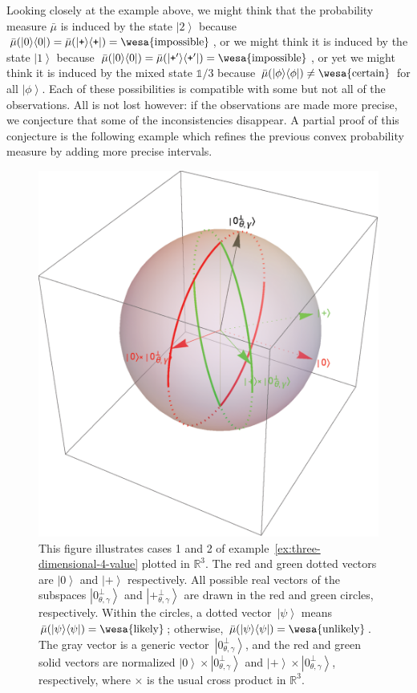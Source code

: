 \documentclass[12pt]{iopart}
\theoremstyle{remark}
\newcommand{\imposs}{{\mbox{\wesa{impossible}}}}
\newcommand{\likely}{{\mbox{\wesa{likely}}}}
\newcommand{\unlikely}{{\mbox{\wesa{unlikely}}}}
\newcommand{\necess}{{\mbox{\wesa{certain}}}}
\newcommand{\ket}[1]{{\left\vert{#1}\right\rangle}}
\newcommand{\op}[2]{\ensuremath{\left\vert{#1}\middle\rangle\middle\langle{#2}\right\vert}}
\newcommand{\proj}[1]{\op{#1}{#1}}
\newcommand{\ps}{\texttt{+}}
\begin{document}
Looking closely at the example above, we might think that the probability
measure $\bar{\mu}$ is induced by the state $\ket{2}$ because $\bar{\mu}(\proj{0})=\bar{\mu}(\proj{\ps})=\imposs$,
or we might think it is induced by the state $\ket{1}$ because $\bar{\mu}(\proj{0})=\bar{\mu}(\proj{\ps'})=\imposs$,
or yet we might think it is induced by the mixed state $\mathbb{1}/3$
because $\bar{\mu}(\proj{\phi})\ne\necess$ for all $\ket{\phi}$.
Each of these possibilities is compatible with some but not all of
the observations. All is not lost however: if the observations are
made more precise, we conjecture that some of the inconsistencies
disappear. A partial proof of this conjecture is the following example
which refines the previous convex probability measure by adding more
precise intervals.
\begin{figure}
\begin{centering}
\includegraphics[scale=0.38]{figure2} 
\par\end{centering}
\caption{\label{fig:three-dimensional-4-value}This figure illustrates cases
1 and 2 of example~\ref{ex:three-dimensional-4-value} plotted in
$\mathbb{R}^{3}$. The red and green dotted vectors are $\ket{0}$
and $\ket{\ps}$ respectively. All possible real vectors of the subspaces
$\ket{0_{\theta,\gamma}^{\perp}}$ and $\ket{\ps_{\theta,\gamma}^{\perp}}$
are drawn in the red and green circles, respectively. Within the circles,
a dotted vector~$\ket{\psi}$ means $\bar{\mu}(\proj{\psi})=\likely$;
otherwise, $\bar{\mu}(\proj{\psi})=\unlikely$. The gray vector is
a generic vector~$\ket{0_{\theta,\gamma}^{\perp}}$, and the red
and green solid vectors are normalized $\ket{0}\times\ket{0_{\theta,\gamma}^{\perp}}$
and $\ket{\ps}\times\ket{0_{\theta,\gamma}^{\perp}}$, respectively,
where $\times$ is the usual cross product in $\mathbb{R}^{3}$.}
\end{figure}
\end{document}
